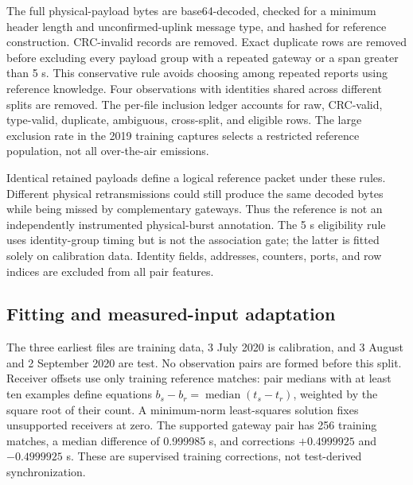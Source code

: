 \documentclass[10pt,a4paper]{article}
\begin{document}
The full physical-payload bytes are base64-decoded, checked for a minimum header length and unconfirmed-uplink message type, and hashed for reference construction. CRC-invalid records are removed. Exact duplicate rows are removed before excluding every payload group with a repeated gateway or a span greater than 5 s. This conservative rule avoids choosing among repeated reports using reference knowledge. Four observations with identities shared across different splits are removed. The per-file inclusion ledger accounts for raw, CRC-valid, type-valid, duplicate, ambiguous, cross-split, and eligible rows. The large exclusion rate in the 2019 training captures selects a restricted reference population, not all over-the-air emissions.

\begin{table}[!htb]\caption{Public-recording inclusion by capture file. Ambiguous rows belong to repeated-gateway or long-span payload groups. Cross-split payload exclusions are applied afterward.}\small\end{table}

Identical retained payloads define a logical reference packet under these rules. Different physical retransmissions could still produce the same decoded bytes while being missed by complementary gateways. Thus the reference is not an independently instrumented physical-burst annotation. The 5 s eligibility rule uses identity-group timing but is not the association gate; the latter is fitted solely on calibration data. Identity fields, addresses, counters, ports, and row indices are excluded from all pair features.

\subsection{Fitting and measured-input adaptation}
The three earliest files are training data, 3 July 2020 is calibration, and 3 August and 2 September 2020 are test. No observation pairs are formed before this split. Receiver offsets use only training reference matches: pair medians with at least ten examples define equations $b_s-b_r=\operatorname{median}(t_s-t_r)$, weighted by the square root of their count. A minimum-norm least-squares solution fixes unsupported receivers at zero. The supported gateway pair has 256 training matches, a median difference of 0.999985 s, and corrections $+0.4999925$ and $-0.4999925$ s. These are supervised training corrections, not test-derived synchronization.
\end{document}
